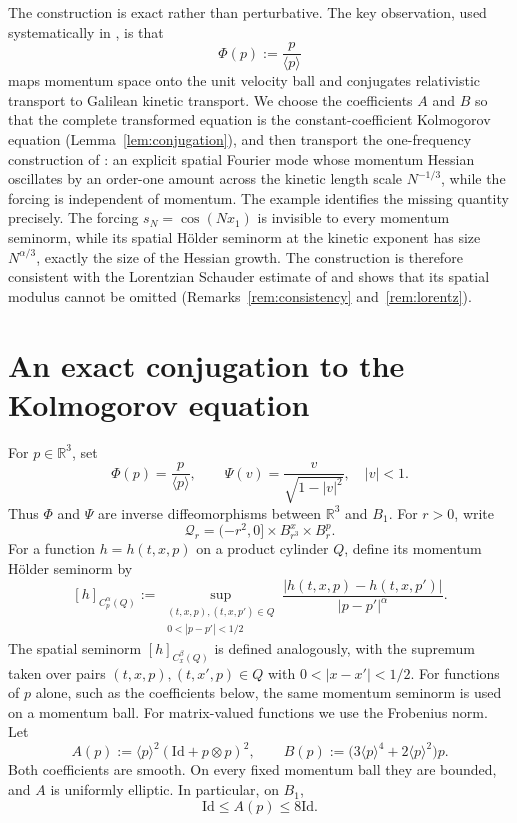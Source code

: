 \documentclass[11pt,reqno]{amsart}
\numberwithin{equation}{section}
\theoremstyle{remark}
\newcommand{\R}{\mathbb R}
\newcommand{\Id}{\mathrm{Id}}
\newcommand{\la}[1]{\langle #1\rangle}
\begin{document}
The construction is exact rather than perturbative.  The key observation, used systematically in \cite{HSTT}, is that
\[
   \Phi(p):=\frac{p}{\la p}
\]
maps momentum space onto the unit velocity ball and conjugates relativistic transport to Galilean kinetic transport.  We choose the coefficients $A$ and $B$ so that the complete transformed equation is the constant-coefficient Kolmogorov equation (Lemma~\ref{lem:conjugation}), and then transport the one-frequency construction of \cite{DW26}: an explicit spatial Fourier mode whose momentum Hessian oscillates by an order-one amount across the kinetic length scale $N^{-1/3}$, while the forcing is independent of momentum. The example identifies the missing quantity precisely.  The forcing $s_N=\cos(Nx_1)$ is invisible to every momentum seminorm, while its spatial H\"older seminorm at the kinetic exponent has size $N^{\alpha/3}$, exactly the size of the Hessian growth.  The construction is therefore consistent with the Lorentzian Schauder estimate of \cite{HSTT} and shows that its spatial modulus cannot be omitted (Remarks~\ref{rem:consistency} and~\ref{rem:lorentz}).
\section{An exact conjugation to the Kolmogorov equation}\label{sec:conjugation}

For $p\in\R^3$, set
\[
   \Phi(p)=\frac{p}{\la p},
   \qquad
   \Psi(v)=\frac{v}{\sqrt{1-|v|^2}},\quad |v|<1.
\]
Thus $\Phi$ and $\Psi$ are inverse diffeomorphisms between $\R^3$ and $B_1$.
For $r>0$, write
\[
   \mathcal Q_r=(-r^2,0]\times B_{r^3}^x\times B_r^p.
\]
For a function $h=h(t,x,p)$ on a product cylinder $Q$, define its momentum H\"older seminorm by
\[
   [h]_{C_p^\alpha(Q)}
   :=\sup_{\substack{(t,x,p),(t,x,p')\in Q\\0<|p-p'|<1/2}}
   \frac{|h(t,x,p)-h(t,x,p')|}{|p-p'|^\alpha}.
\]
The spatial seminorm $[h]_{C_x^\beta(Q)}$ is defined analogously, with the supremum taken over pairs $(t,x,p),(t,x',p)\in Q$ with $0<|x-x'|<1/2$.  For functions of $p$ alone, such as the coefficients below, the same momentum seminorm is used on a momentum ball.  For matrix-valued functions we use the Frobenius norm. Let
\begin{equation}\label{eq:AB-def}
   A(p):=\la p^2(\Id+p\otimes p)^2,
   \qquad
   B(p):=\bigl(3\la p^4+2\la p^2\bigr)p.
\end{equation}
Both coefficients are smooth.  On every fixed momentum ball they are bounded, and $A$ is uniformly elliptic.  In particular, on $B_1$,
\[
   \Id\le A(p)\le 8\Id.
\]
\end{document}
